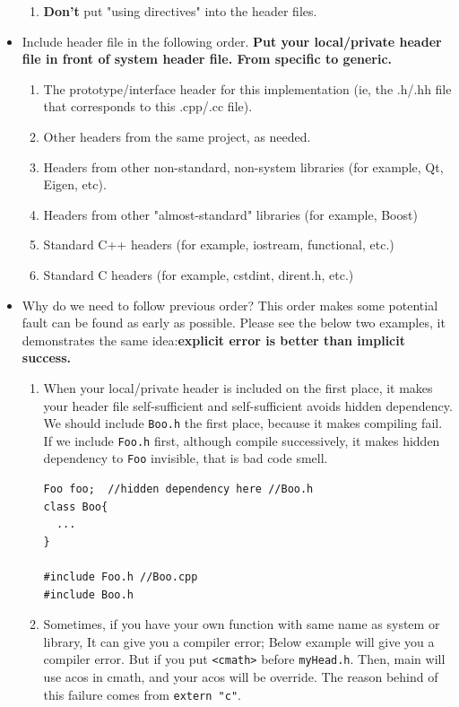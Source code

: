 \documentclass[a4paper,11pt,twoside]{book}
\begin{document}
\begin{itemize}
\begin{enumerate}
        \item \textbf{Don't} put "using directives" into the header files.
	\end{enumerate}

	\item Include header file in the following order. \textbf{Put your local/private header file in front of system header file. From specific to generic.} 
	\begin{enumerate}
		\item The prototype/interface header for this implementation (ie, the .h/.hh file that corresponds to this .cpp/.cc file).
		\item Other headers from the same project, as needed.
		\item Headers from other non-standard, non-system libraries (for example, Qt, Eigen, etc).
		\item Headers from other "almost-standard" libraries (for example, Boost)
		\item Standard C++ headers (for example, iostream, functional, etc.)
		\item Standard C headers (for example, cstdint, dirent.h, etc.)
	\end{enumerate}
	
    \item Why do we need to follow previous order?  This order makes some potential fault can be found as early as possible. Please see the below two examples, it demonstrates the same idea:\textbf{explicit error is better than implicit success.}
	
	\begin{enumerate}

			\item When your local/private header is included on the first place, it makes your header file self-sufficient and self-sufficient avoids hidden dependency. We should include \texttt{Boo.h} the first place, because it makes compiling fail. If we include \texttt{Foo.h} first, although compile successively, it makes hidden dependency to \texttt{Foo} invisible, that is bad code smell. 

\begin{lstlisting}[numbers=none]
Foo foo;  //hidden dependency here //Boo.h
class Boo{
  ...
}

#include Foo.h //Boo.cpp
#include Boo.h 
\end{lstlisting}
			
			\item Sometimes, if you have your own function with same name as system or library, It can give you a compiler error; Below example will give you a compiler error. But if you put \texttt{<cmath>} before \texttt{myHead.h}. Then, main will use acos in cmath, and your acos will be override. The reason behind of this failure comes from \texttt{extern "c"}.
		

\end{enumerate}
\end{itemize}
\end{document}
